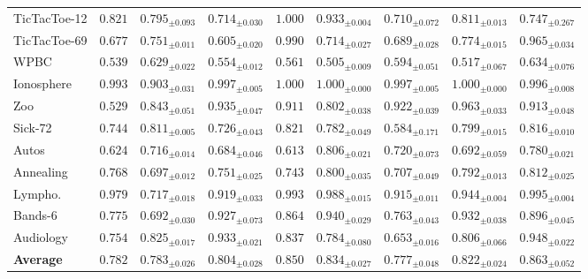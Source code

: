 \begin{table}[t]
{\begin{tabular}{lccccccc c}
TicTacToe-12 & $0.821$ & $0.795_{\pm0.093}$ & $0.714_{\pm0.030}$ & $\mathbf{1.000}$ & $0.933_{\pm0.004}$ & $0.710_{\pm0.072}$ & $0.811_{\pm0.013}$ & $0.747_{\pm0.267}$ \\
TicTacToe-69 & $0.677$ & $0.751_{\pm0.011}$ & $0.605_{\pm0.020}$ & $\mathbf{0.990}$ & $0.714_{\pm0.027}$ & $0.689_{\pm0.028}$ & $0.774_{\pm0.015}$ & $0.965_{\pm0.034}$ \\
WPBC         & $0.539$ & $0.629_{\pm0.022}$ & $0.554_{\pm0.012}$ & $0.561$ & $0.505_{\pm0.009}$ & $0.594_{\pm0.051}$ & $0.517_{\pm0.067}$ & $\mathbf{0.634}_{\pm0.076}$ \\
Ionosphere   & $0.993$ & $0.903_{\pm0.031}$ & $0.997_{\pm0.005}$ & $\mathbf{1.000}$ & $\mathbf{1.000}_{\pm0.000}$ & $0.997_{\pm0.005}$ & $\mathbf{1.000}_{\pm0.000}$ & $0.996_{\pm0.008}$ \\
Zoo          & $0.529$ & $0.843_{\pm0.051}$ & $0.935_{\pm0.047}$ & $0.911$ & $0.802_{\pm0.038}$ & $0.922_{\pm0.039}$ & $\mathbf{0.963}_{\pm0.033}$ & $0.913_{\pm0.048}$ \\
Sick-72      & $0.744$ & $0.811_{\pm0.005}$ & $0.726_{\pm0.043}$ & $\mathbf{0.821}$ & $0.782_{\pm0.049}$ & $0.584_{\pm0.171}$ & $0.799_{\pm0.015}$ & $0.816_{\pm0.010}$ \\
Autos        & $0.624$ & $0.716_{\pm0.014}$ & $0.684_{\pm0.046}$ & $0.613$ & $\mathbf{0.806}_{\pm0.021}$ & $0.720_{\pm0.073}$ & $0.692_{\pm0.059}$ & $0.780_{\pm0.021}$ \\
Annealing    & $0.768$ & $0.697_{\pm0.012}$ & $0.751_{\pm0.025}$ & $0.743$ & $0.800_{\pm0.035}$ & $0.707_{\pm0.049}$ & $0.792_{\pm0.013}$ & $\mathbf{0.812}_{\pm0.025}$ \\
Lympho.      & $0.979$ & $0.717_{\pm0.018}$ & $0.919_{\pm0.033}$ & $0.993$ & $0.988_{\pm0.015}$ & $0.915_{\pm0.011}$ & $0.944_{\pm0.004}$ & $\mathbf{0.995}_{\pm0.004}$ \\
Bands-6      & $0.775$ & $0.692_{\pm0.030}$ & $0.927_{\pm0.073}$ & $0.864$ & $\mathbf{0.940}_{\pm0.029}$ & $0.763_{\pm0.043}$ & $0.932_{\pm0.038}$ & $0.896_{\pm0.045}$ \\
Audiology    & $0.754$ & $0.825_{\pm0.017}$ & $0.933_{\pm0.021}$ & $0.837$ & $0.784_{\pm0.080}$ & $0.653_{\pm0.016}$ & $0.806_{\pm0.066}$ & $\mathbf{0.948}_{\pm0.022}$ \\
\midrule
\textbf{Average} & $0.782$ & $0.783_{\pm0.026}$ & $0.804_{\pm0.028}$ & $0.850$ & $0.834_{\pm0.027}$ & $0.777_{\pm0.048}$ & $0.822_{\pm0.024}$ & $\mathbf{0.863}_{\pm0.052}$ \\
\bottomrule
\end{tabular}
}
\end{table}
